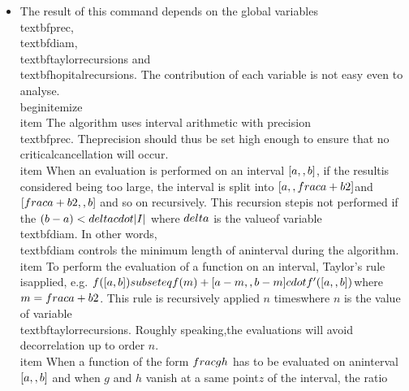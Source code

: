 \begin{itemize}
\item The result of this command depends on the global variables \\textbf{prec}, \\textbf{diam},\n   \\textbf{taylorrecursions} and \\textbf{hopitalrecursions}. The contribution of each variable is \n   not easy even to analyse.\n   \\begin{itemize}\n   \\item  The algorithm uses interval arithmetic with precision \\textbf{prec}. The\n     precision should thus be set high enough to ensure that no critical\n     cancellation will occur.\n   \\item  When an evaluation is performed on an interval $[a,\\,b]$, if the result\n     is considered being too large, the interval is split into $[a,\\,\\frac{a+b}{2}]$\n     and $[\\frac{a+b}{2},\\,b]$ and so on recursively. This recursion step\n     is  not performed if the $(b-a) < \\delta \\cdot |I|$ where $\\delta$ is the value\n     of variable \\textbf{diam}. In other words, \\textbf{diam} controls the minimum length of an\n     interval during the algorithm.\n   \\item  To perform the evaluation of a function on an interval, Taylor's rule is\n     applied, e.g. $f([a,b]) \\subseteq f(m) + [a-m,\\,b-m] \\cdot f'([a,\\,b])$\n     where $m=\\frac{a+b}{2}$. This rule is recursively applied $n$ times\n     where $n$ is the value of variable \\textbf{taylorrecursions}. Roughly speaking,\n     the evaluations will avoid decorrelation up to order $n$.\n   \\item  When a function of the form $\\frac{g}{h}$ has to be evaluated on an\n     interval $[a,\\,b]$ and when $g$ and $h$ vanish at a same point\n     $z$ of the interval, the ratio 
\end{itemize}

